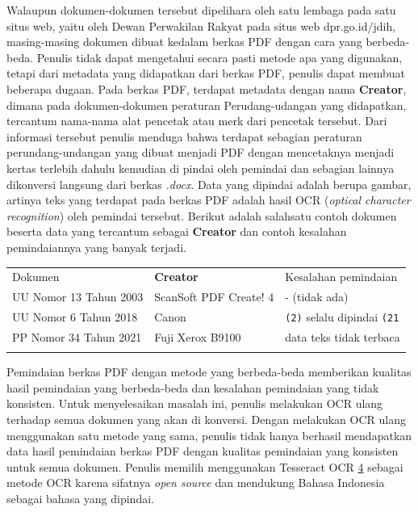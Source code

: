Walaupun dokumen-dokumen tersebut dipelihara oleh satu lembaga pada satu
situs web, yaitu oleh Dewan Perwakilan Rakyat pada situs web
dpr.go.id/jdih, masing-masing dokumen dibuat kedalam berkas PDF dengan
cara yang berbeda-beda. Penulis tidak dapat mengetahui secara pasti
metode apa yang digunakan, tetapi dari metadata yang didapatkan dari
berkas PDF, penulis dapat membuat beberapa dugaan. Pada berkas PDF,
terdapat metadata dengan nama \textbf{Creator}, dimana pada
dokumen-dokumen peraturan Perudang-udangan yang didapatkan, tercantum
nama-nama alat pencetak atau merk dari pencetak tersebut. Dari informasi
tersebut penulis menduga bahwa terdapat sebagian peraturan
perundang-undangan yang dibuat menjadi PDF dengan mencetaknya menjadi
kertas terlebih dahulu kemudian di pindai oleh pemindai dan sebagian
lainnya dikonversi langsung dari berkas \emph{.docx}. Data yang dipindai
adalah berupa gambar, artinya teks yang terdapat pada berkas PDF adalah
hasil OCR (\emph{optical character recognition}) oleh pemindai tersebut.
Berikut adalah salahsatu contoh dokumen beserta data yang tercantum
sebagai \textbf{Creator} dan contoh kesalahan pemindaiannya yang banyak
terjadi.

\begin{longtable}[c]{@{}lll@{}}
\toprule\addlinespace
Dokumen & \textbf{Creator} & Kesalahan pemindaian
\\\addlinespace
\midrule\endhead
UU Nomor 13 Tahun 2003 & ScanSoft PDF Create! 4 & - (tidak ada)
\\\addlinespace
UU Nomor 6 Tahun 2018 & Canon & \texttt{(2)} selalu dipindai
\texttt{(21}
\\\addlinespace
PP Nomor 34 Tahun 2021 & Fuji Xerox B9100 & data teks tidak terbaca
\\\addlinespace
\bottomrule
\end{longtable}

Pemindaian berkas PDF dengan metode yang berbeda-beda memberikan
kualitas hasil pemindaian yang berbeda-beda dan kesalahan pemindaian
yang tidak konsisten. Untuk menyelesaikan masalah ini, penulis melakukan
OCR ulang terhadap semua dokumen yang akan di konversi. Dengan melakukan
OCR ulang menggunakan satu metode yang sama, penulis tidak hanya
berhasil mendapatkan data hasil pemindaian berkas PDF dengan kualitas
pemindaian yang konsisten untuk semua dokumen. Penulis memilih
menggunakan Tesseract OCR
\href{https://github.com/tesseract-ocr/tesseract}{4} sebagai metode OCR
karena sifatnya \emph{open source} dan mendukung Bahasa Indonesia
sebagai bahasa yang dipindai.

